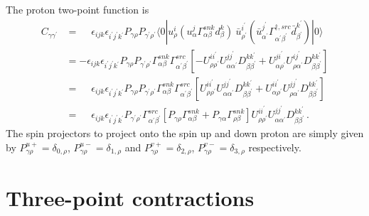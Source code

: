 \documentclass[prd,12pt,superscriptaddress,tightenlines,nofootinbib]{revtex4}
\def\a{{\alpha}}
\def\b{{\beta}}
\def\g{{\gamma}}
\def\G{{\Gamma}}
\def\ip{{i^\prime}}
\def\jp{{j^\prime}}
\def\kp{{k^\prime}}
\def\ap{{\alpha^\prime}}
\def\bp{{\beta^\prime}}
\def\gp{{\gamma^\prime}}
\def\rp{{\rho^\prime}}
\begin{document}
The proton two-point function is
\begin{align}
C_{\g\gp} &= \phantom{-}\epsilon_{ijk} \epsilon_{\ip\jp\kp} P_{\g\rho} P_{\gp\rp} \langle 0|
	u^i_\rho (u^j_\a \G^{snk}_{\a\b} d^k_\b ) \ \bar{u}^\ip_\rp (\bar{u}^{\jp}_{\ap} \G^{\dagger,src}_{\ap\bp} \bar{d}^\kp_\bp )
	|0\rangle
\nonumber\\ &=
	-\epsilon_{ijk} \epsilon_{\ip\jp\kp} P_{\g\rho} P_{\gp\rp} \G^{snk}_{\a\b} \G^{src}_{\ap\bp}
	\left[ -U^{i\ip}_{\rho\rp} U^{j\jp}_{\a\ap} D^{k\kp}_{\b\bp}
		+ U^{j\ip}_{\a\rp} U^{i\jp}_{\rho\ap} D^{k\kp}_{\b\bp}
	\right]
\nonumber\\ &=
	\phantom{-}\epsilon_{ijk} \epsilon_{\ip\jp\kp} P_{\g\rho} P_{\gp\rp} \G^{snk}_{\a\b} \G^{src}_{\ap\bp}
	\left[
		U^{i\ip}_{\rho\rp} U^{j\jp}_{\a\ap} D^{k\kp}_{\b\bp}
		+U^{i\ip}_{\a\rp} U^{j\jp}_{\rho\ap} D^{k\kp}_{\b\bp}
	\right]
\nonumber\\ &=
	\phantom{-}\epsilon_{ijk} \epsilon_{\ip\jp\kp}  P_{\gp\rp}  \G^{src}_{\ap\bp}
	\left[
		P_{\g\rho} \G^{snk}_{\a\b} + P_{\g\a} \G^{snk}_{\rho\b}
	\right]
	U^{i\ip}_{\rho\rp} U^{j\jp}_{\a\ap} D^{k\kp}_{\b\bp} \, .
\end{align}
The spin projectors to project onto the spin up and down proton are simply given by $P^{u+}_{\g\rho} = \delta_{0,\rho}$, $P^{u-}_{\g\rho} = \delta_{1,\rho}$ and $P^{v+}_{\g\rho} = \delta_{2,\rho}$, $P^{v-}_{\g\rho} = \delta_{3,\rho}$ respectively.

\section{Three-point contractions}
\end{document}
